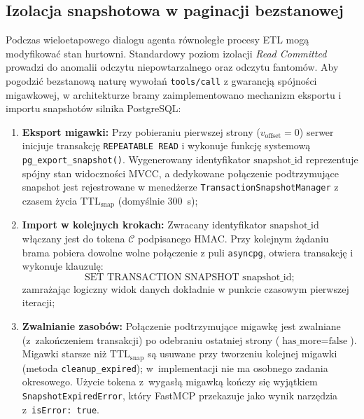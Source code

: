 \subsection{Izolacja snapshotowa w paginacji bezstanowej}
\label{subsec:projekt_snapshot_isolation}

Podczas wieloetapowego dialogu agenta równoległe procesy ETL mogą modyfikować stan hurtowni. Standardowy poziom izolacji \emph{Read Committed} prowadzi do anomalii odczytu niepowtarzalnego oraz odczytu fantomów. Aby pogodzić bezstanową naturę wywołań \texttt{tools/call} z gwarancją spójności migawkowej, w architekturze bramy zaimplementowano mechanizm eksportu i importu snapshotów silnika PostgreSQL:
\begin{enumerate}
    \item \textbf{Eksport migawki:} Przy pobieraniu pierwszej strony ($v_{\text{offset}} = 0$) serwer inicjuje transakcję \texttt{REPEATABLE READ} i wykonuje funkcję systemową \texttt{pg\_export\_snapshot()}. Wygenerowany identyfikator $\text{snapshot\_id}$ reprezentuje spójny stan widoczności MVCC, a dedykowane połączenie podtrzymujące snapshot jest rejestrowane w menedżerze \texttt{TransactionSnapshotManager} z czasem życia $\text{TTL}_{\text{snap}}$ (domyślnie 300~s);
    \item \textbf{Import w kolejnych krokach:} Zwracany identyfikator $\text{snapshot\_id}$ włączany jest do tokena $\mathcal{C}$ podpisanego HMAC. Przy kolejnym żądaniu brama pobiera dowolne wolne połączenie z puli \texttt{asyncpg}, otwiera transakcję i wykonuje klauzulę:
    \begin{equation}
    \text{SET TRANSACTION SNAPSHOT } \text{snapshot\_id};
    \label{eq:set_transaction_snapshot}
    \end{equation}
    zamrażając logiczny widok danych dokładnie w punkcie czasowym pierwszej iteracji;
    \item \textbf{Zwalnianie zasobów:} Połączenie podtrzymujące migawkę jest zwalniane (z~zakończeniem transakcji) po odebraniu ostatniej strony ($\text{has\_more} = \text{false}$). Migawki starsze niż $\text{TTL}_{\text{snap}}$ są usuwane przy tworzeniu kolejnej migawki (metoda \texttt{cleanup\_expired}); w~implementacji nie ma osobnego zadania okresowego. Użycie tokena z~wygasłą migawką kończy się wyjątkiem \texttt{SnapshotExpiredError}, który FastMCP przekazuje jako wynik narzędzia z~\texttt{isError: true}.
\end{enumerate}

